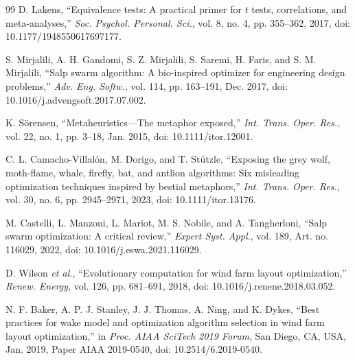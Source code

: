 \begin{thebibliography}{99}
D. Lakens, ``Equivalence tests: A practical primer for $t$ tests, correlations, and meta-analyses,'' \textit{Soc. Psychol. Personal. Sci.}, vol. 8, no. 4, pp. 355--362, 2017, doi: 10.1177/1948550617697177.

S. Mirjalili, A. H. Gandomi, S. Z. Mirjalili, S. Saremi, H. Faris, and S. M. Mirjalili, ``Salp swarm algorithm: A bio-inspired optimizer for engineering design problems,'' \textit{Adv. Eng. Softw.}, vol. 114, pp. 163--191, Dec. 2017, doi: 10.1016/j.advengsoft.2017.07.002.

K. S\"orensen, ``Metaheuristics---The metaphor exposed,'' \textit{Int. Trans. Oper. Res.}, vol. 22, no. 1, pp. 3--18, Jan. 2015, doi: 10.1111/itor.12001.

C. L. Camacho-Villal\'on, M. Dorigo, and T. St\"utzle, ``Exposing the grey wolf, moth-flame, whale, firefly, bat, and antlion algorithms: Six misleading optimization techniques inspired by bestial metaphors,'' \textit{Int. Trans. Oper. Res.}, vol. 30, no. 6, pp. 2945--2971, 2023, doi: 10.1111/itor.13176.

M. Castelli, L. Manzoni, L. Mariot, M. S. Nobile, and A. Tangherloni, ``Salp swarm optimization: A critical review,'' \textit{Expert Syst. Appl.}, vol. 189, Art. no. 116029, 2022, doi: 10.1016/j.eswa.2021.116029.

D. Wilson \textit{et al.}, ``Evolutionary computation for wind farm layout optimization,'' \textit{Renew. Energy}, vol. 126, pp. 681--691, 2018, doi: 10.1016/j.renene.2018.03.052.

N. F. Baker, A. P. J. Stanley, J. J. Thomas, A. Ning, and K. Dykes, ``Best practices for wake model and optimization algorithm selection in wind farm layout optimization,'' in \textit{Proc. AIAA SciTech 2019 Forum}, San Diego, CA, USA, Jan. 2019, Paper AIAA 2019-0540, doi: 10.2514/6.2019-0540.


\end{thebibliography}
